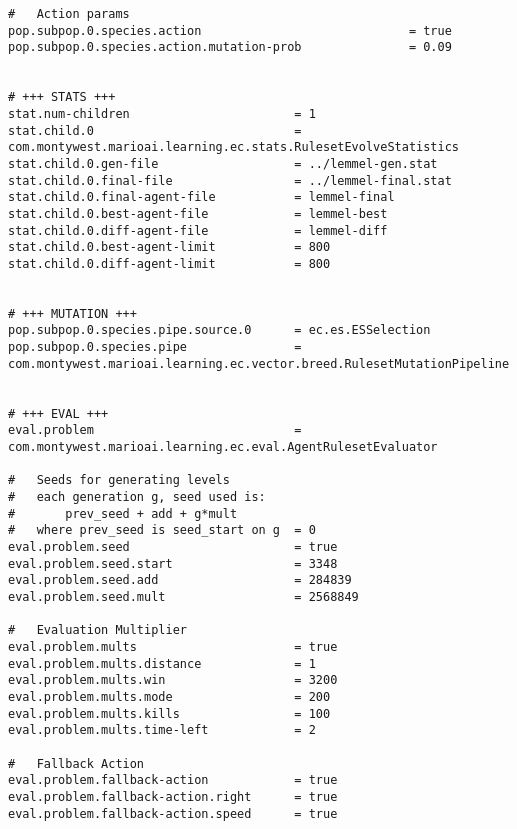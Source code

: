 \begin{minipage}{0.9\linewidth}
\begin{lstlisting}
#	Action params
pop.subpop.0.species.action								= true
pop.subpop.0.species.action.mutation-prob 				= 0.09


# +++ STATS +++
stat.num-children 						= 1
stat.child.0 							= com.montywest.marioai.learning.ec.stats.RulesetEvolveStatistics
stat.child.0.gen-file					= ../lemmel-gen.stat
stat.child.0.final-file 				= ../lemmel-final.stat
stat.child.0.final-agent-file			= lemmel-final
stat.child.0.best-agent-file			= lemmel-best
stat.child.0.diff-agent-file			= lemmel-diff
stat.child.0.best-agent-limit			= 800
stat.child.0.diff-agent-limit			= 800


# +++ MUTATION +++
pop.subpop.0.species.pipe.source.0 		= ec.es.ESSelection
pop.subpop.0.species.pipe 				= com.montywest.marioai.learning.ec.vector.breed.RulesetMutationPipeline


# +++ EVAL +++
eval.problem							= com.montywest.marioai.learning.ec.eval.AgentRulesetEvaluator

#	Seeds for generating levels
#	each generation g, seed used is:
#		prev_seed + add + g*mult
#   where prev_seed is seed_start on g  = 0
eval.problem.seed						= true
eval.problem.seed.start					= 3348
eval.problem.seed.add					= 284839
eval.problem.seed.mult					= 2568849

#	Evaluation Multiplier
eval.problem.mults						= true
eval.problem.mults.distance				= 1
eval.problem.mults.win					= 3200
eval.problem.mults.mode					= 200
eval.problem.mults.kills				= 100
eval.problem.mults.time-left			= 2

#	Fallback Action
eval.problem.fallback-action			= true
eval.problem.fallback-action.right		= true
eval.problem.fallback-action.speed		= true
\end{lstlisting}
\end{minipage}

